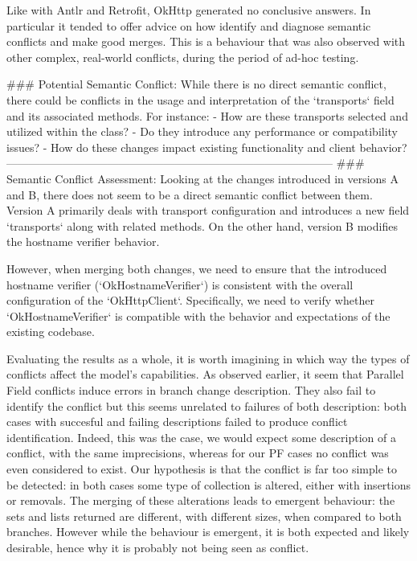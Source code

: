 Like with Antlr and Retrofit, OkHttp generated no conclusive answers. In particular it tended to offer advice on how identify and diagnose semantic conflicts and make good merges. This is a behaviour that was also observed with other complex, real-world conflicts, during the period of ad-hoc testing.
\begin{response}
### Potential Semantic Conflict:
While there is no direct semantic conflict, there could be conflicts in the usage and interpretation of the `transports` field and its associated methods. For instance:
- How are these transports selected and utilized within the class?
- Do they introduce any performance or compatibility issues?
- How do these changes impact existing functionality and client behavior?
---------------------------------------------------------------------------------------
### Semantic Conflict Assessment:
Looking at the changes introduced in versions A and B, there does not seem to be a direct semantic conflict between them. Version A primarily deals with transport configuration and introduces a new field `transports` along with related methods. On the other hand, version B modifies the hostname verifier behavior.

However, when merging both changes, we need to ensure that the introduced hostname verifier (`OkHostnameVerifier`) is consistent with the overall configuration of the `OkHttpClient`. Specifically, we need to verify whether `OkHostnameVerifier` is compatible with the behavior and expectations of the existing codebase.
\end{response}

Evaluating the results as a whole, it is worth imagining in which way the types of conflicts affect the model's capabilities.
As observed earlier, it seem that Parallel Field conflicts induce errors in branch change description. They also fail to identify the conflict but this seems unrelated to failures of both description:
both cases with succesful and failing descriptions failed to produce conflict identification. Indeed, this was the case, we would expect some description of a conflict, with the same imprecisions, whereas
for our PF cases no conflict was even considered to exist. Our hypothesis is that the conflict is far too simple to be detected: in both cases some type of collection is altered, either with insertions or removals.
The merging of these alterations leads to emergent behaviour: the sets and lists returned are different, with different sizes, when compared to both branches.
However while the behaviour is emergent, it is both expected and likely desirable, hence why it is probably not being seen as conflict.

